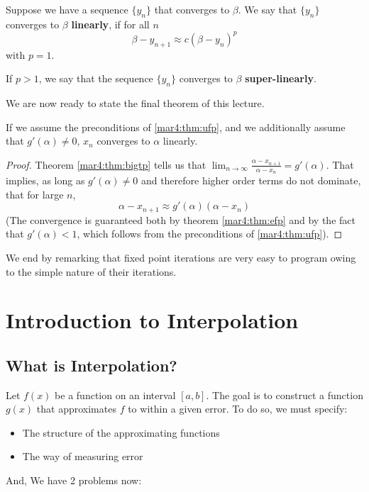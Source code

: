 \begin{defn}
	Suppose we have a sequence $\{y_n \}$ that converges to $\beta$. We say that $\{y_n \}$ converges to $\beta$ \textbf{linearly}, if for all $n$
	\[
		\beta - y_{n+1} \approx c(\beta - y_n)^p
	\]
	with $p = 1$.

	If $p > 1$, we say that the sequence $\{y_n \}$ converges to $\beta$ \textbf{super-linearly}.
\end{defn}
We are now ready to state the final theorem of this lecture.
\begin{thm}
	If we assume the preconditions of \ref{mar4:thm:ufp}, and we additionally assume that $g'(\alpha) \neq 0$, $x_n$ converges to $\alpha$ linearly.
\end{thm}
\begin{proof}
	Theorem \ref{mar4:thm:bigtp} tells us that $\lim_{n\to\infty} \frac{\alpha - x_{n+1}}{\alpha - x_n} = g'(\alpha)$. That implies, as long as $g'(\alpha) \neq 0$ and therefore higher order terms do not dominate, that for large $n$,
	\[
		\alpha - x_{n+1} \approx g'(\alpha)(\alpha - x_n)
	\]
	(The convergence is guaranteed both by theorem \ref{mar4:thm:efp} and by the fact that $g'(\alpha) < 1$, which follows from the preconditions of \ref{mar4:thm:ufp}).
	\hfill
\end{proof}

We end by remarking that fixed point iterations are very easy to program owing to the simple nature of their iterations.

\newpage
\section{Introduction to Interpolation}
\subsection{What is Interpolation?}
Let $f(x)$ be a function on an interval $[a, b]$. The goal is to construct a function $g(x)$ that
approximates $f$ to within a given error. To do so, we must specify:
\begin{itemize}
	\item The structure of the approximating functions
	\item The way of measuring error
\end{itemize}
And, We have 2 problems now:

